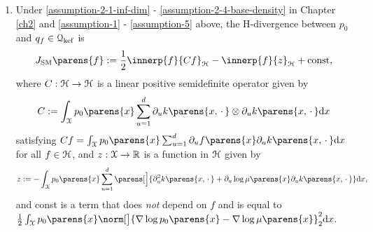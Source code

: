 \begin{theorem}\label{thm-smloss} \leavevmode
\begin{enumerate}[label=(\alph*)]
	\item Under \ref{assumption-2-1-inf-dim} - \ref{assumption-2-4-base-density} in Chapter \ref{ch2} and \ref{assumption-1} - \ref{assumption-5} above, the H-divergence between $p_0$ and $q_f \in \mathcal{Q}_{\mathrm{kef}}$ is 
	\begin{align*}
		J_{\SM} \parens{f} := \frac{1}{2} \innerp{f}{C f}_{\calH} - \innerp{f}{z}_{\calH} + \mathrm{const}, 
	\end{align*}
	where $C: \mathcal{H} \to \mathcal{H}$ is a linear positive semidefinite operator given by 
	\begin{align}\label{eq-C-def}
		C := \int_{\calX} p_0 \parens{x} \sum_{u=1}^d \partial_u k \parens{x, \,\cdot\,} \otimes \partial_u k \parens{x, \,\cdot\,} \diff x
	\end{align}
	satisfying $C f = \int_{\calX} p_0 \parens{x} \sum_{u=1}^d \partial_u f \parens{x} \partial_u k \parens{x, \,\cdot\,} \diff x$ for all $f \in \mathcal{H}$, and $z: \mathcal{X} \to \mathbb{R}$ is a function in $\mathcal{H}$ given by 
	\begin{align}\label{eq-z-def}
		z := - \int_{\calX} p_0 \parens{x} \sum_{u=1}^d \parens[\Big]{\partial^2_u k \parens{x, \,\cdot\,} + \partial_u \log \mu \parens{x} \partial_u k \parens{x, \,\cdot\,}} \diff x, 
	\end{align}
	and const is a term that does \emph{not} depend on $f$ and is equal to $\frac{1}{2} \int_{\calX} p_0 \parens{x} \norm[\big]{\nabla \log p_0 \parens{x} - \nabla \log \mu \parens{x}}_2^2 \diff x$. 
	

\end{enumerate}
\end{theorem}
